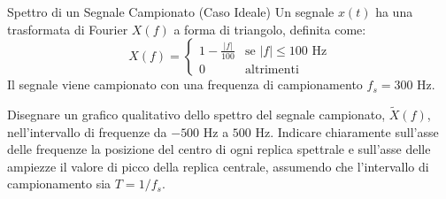 
\begin{esercizio}{Spettro di un Segnale Campionato (Caso Ideale)}
    Un segnale $x(t)$ ha una trasformata di Fourier $X(f)$ a forma di triangolo, definita come:
    \[
        X(f) = 
        \begin{cases} 
            1 - \frac{|f|}{100} & \text{se } |f| \leq 100 \text{ Hz} \\
            0 & \text{altrimenti}
        \end{cases}
    \]
    Il segnale viene campionato con una frequenza di campionamento $f_s = 300$ Hz.
    
    Disegnare un grafico qualitativo dello spettro del segnale campionato, $\tilde{X}(f)$, nell'intervallo di frequenze da $-500$ Hz a $500$ Hz. Indicare chiaramente sull'asse delle frequenze la posizione del centro di ogni replica spettrale e sull'asse delle ampiezze il valore di picco della replica centrale, assumendo che l'intervallo di campionamento sia $T = 1/f_s$.
\end{esercizio}